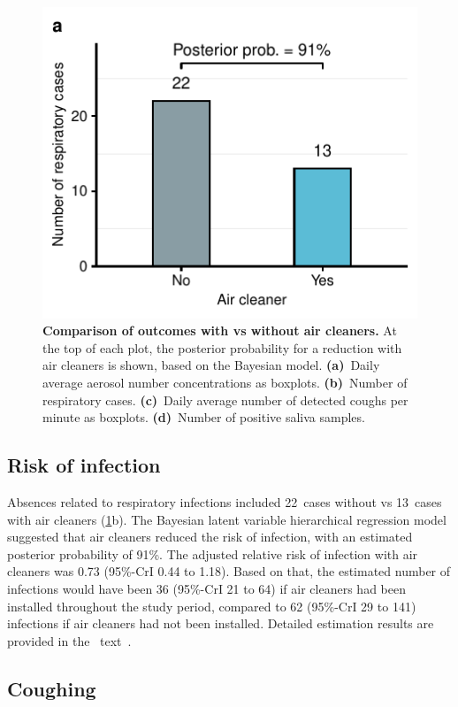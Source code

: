 \documentclass[fleqn,11pt]{wlscirep}
\begin{document}
\begin{figure}[!htpb]
    \includegraphics{../../results/epi-data/cases_by_condition.pdf}
    \caption{\textbf{Comparison of outcomes with vs without air cleaners.} At the top of each plot, the posterior probability for a reduction with air cleaners is shown, based on the Bayesian model. \textbf{(a)}~Daily average aerosol number concentrations as boxplots. \textbf{(b)}~Number of respiratory cases. \textbf{(c)}~Daily average number of detected coughs per minute as boxplots. \textbf{(d)}~Number of positive saliva samples.}
    \label{fig:infection-risk}
\end{figure}

\subsection*{Risk of infection}

Absences related to respiratory infections included 22~cases without vs 13~cases with air cleaners (\cref{fig:infection-risk}b). The Bayesian latent variable hierarchical regression model suggested that air cleaners reduced the risk of infection, with an estimated posterior probability of 91\%. The adjusted relative risk of infection with air cleaners was 0.73 (95\%-CrI 0.44 to 1.18). Based on that, the estimated number of infections would have been 36 (95\%-CrI 21 to 64) if air cleaners had been installed throughout the study period, compared to 62 (95\%-CrI 29 to 141) infections if air cleaners had not been installed. Detailed estimation results are provided in the \supp~text~. 

\subsection*{Coughing}
\end{document}
